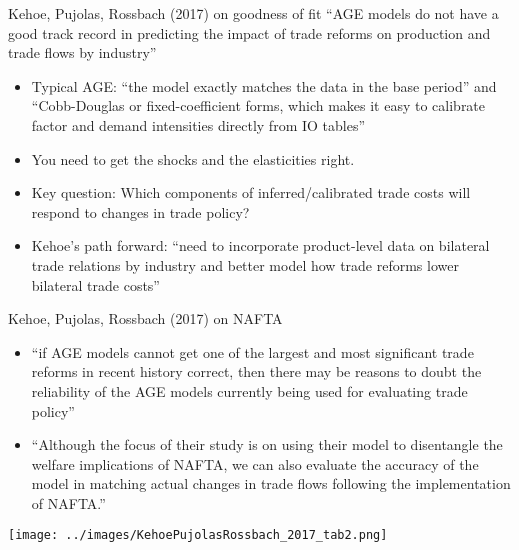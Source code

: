 \documentclass[10pt,notes=hide]{beamer}
\begin{document}
\begin{frame}{Kehoe, Pujolas, Rossbach (2017) on goodness of fit}
``AGE models do not have a good track record in predicting the impact of trade reforms on production and trade flows by industry''
\begin{itemize}
\item Typical AGE: ``the model exactly matches the data in the base period'' and ``Cobb-Douglas or fixed-coefficient forms, which makes it easy to calibrate factor and demand intensities directly from IO tables''
\item You need to get the shocks and the elasticities right.
\item Key question: Which components of inferred/calibrated trade costs will respond to changes in trade policy?
\item Kehoe's path forward: ``need to incorporate product-level data on bilateral trade relations by industry and better model how trade reforms lower bilateral trade costs''
\end{itemize}
\end{frame}
\begin{frame}{Kehoe, Pujolas, Rossbach (2017) on NAFTA}
\begin{itemize}
\item {\small ``if AGE models cannot get one of the largest and most significant trade reforms in recent history correct, then there may be reasons to doubt the reliability of the AGE models currently being used for evaluating trade policy''\par}
\item {\small ``Although the focus of their study is on using their model to disentangle the welfare implications of NAFTA, we can also evaluate the accuracy of the model in matching actual changes in trade flows following the implementation of NAFTA.''\par}
\end{itemize}
\texttt{[image: ../images/KehoePujolasRossbach\_2017\_tab2.png]}
\end{frame}
\end{document}
